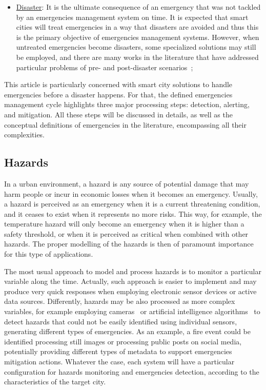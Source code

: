 \begin{refsection}
\begin{itemize}
  \item \underline{Disaster}: It is the ultimate consequence of an emergency that was not tackled by an emergencies management system on time. It is expected that smart cities will treat emergencies in a way that disasters are avoided and thus this is the primary objective of emergencies management systems. However, when untreated emergencies become disasters, some specialized solutions may still be employed, and there are many works in the literature that have addressed particular problems of pre- and post-disaster scenarios~\cite{citiesdisasters1,citiesdisasters2};
\end{itemize}

This article is particularly concerned with smart city solutions to handle emergencies before a disaster happens. For that, the defined emergencies management cycle highlights three major processing steps: detection, alerting, and mitigation. All these steps will be discussed in details, as well as the conceptual definitions of emergencies in the literature, encompassing all their complexities. 

\subsection {Hazards}

In a urban environment, a hazard is any source of potential damage that may harm people or incur in economic losses when it becomes an emergency. Usually, a hazard is perceived as an emergency when it is a current threatening condition, and it ceases to exist when it represents no more risks. This way, for example, the temperature hazard will only become an emergency when it is higher than a safety threshold, or when it is perceived as critical when combined with other hazards. The proper modelling of the hazards is then of paramount importance for this type of applications.

The most usual approach to model and process hazards is to monitor a particular variable along the time. Actually, such approach is easier to implement and may produce very quick responses when employing electronic sensor devices or active data sources. Differently, hazards may be also processed as more complex variables, for example employing cameras~\cite{emergenciesmetric3} or artificial intelligence algorithms~\cite{emergenciesAI1} to detect hazards that could not be easily identified using individual sensors, generating different types of emergencies. As an example, a fire event could be identified processing still images or processing public posts on social media, potentially providing different types of metadata to support emergencies mitigation actions. Whatever the case, each system will have a particular configuration for hazards monitoring and emergencies detection, according to the characteristics of the target city.


\end{refsection}
